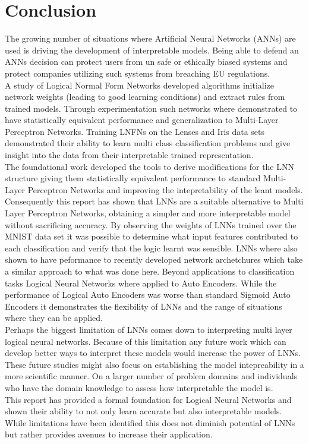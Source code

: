 \chapter{Conclusion}\label{C:con}
The growing number of situations where Artificial Neural Networks (ANNs) are used is driving the development of interpretable models. Being able to defend an ANNs decision can protect users from un safe or ethically biased systems and protect companies utilizing such systems from breaching EU regulations.\\

A study of Logical Normal Form Networks developed algorithms initialize network weights (leading to good learning conditions) and extract rules from trained models. Through experimentation such networks where demonstrated to have statistically equivalent performance and generalization to Multi-Layer Perceptron Networks. Training LNFNs on the Lenses and Iris data sets demonstrated their ability to learn multi class classification problems and give insight into the data from their interpretable trained representation.\\

The foundational work developed the tools to derive modifications for the LNN structure giving them statistically equivalent performance to standard Multi-Layer Perceptron Networks and improving the intepretability of the leant models. Consequently this report has shown that LNNs are a suitable alternative to Multi Layer Perceptron Networks, obtaining a simpler and more interpretable model without sacrificing accuracy. By observing the weights of LNNs trained over the MNIST data set it was possible to determine what input features contributed to each classification and verify that the logic learnt was sensible. LNNs where also shown to have peformance to recently developed network archetchures which take a similar approach to what was done here. Beyond applications to classification tasks Logical Neural Networks where applied to Auto Encoders. While the performance of Logical Auto Encoders was worse than standard Sigmoid Auto Encoders it demonstrates the flexibility of LNNs and the range of situations where they can be applied.\\

Perhaps the biggest limitation of LNNs comes down to interpreting multi layer logical neural networks. Because of this limitation any future work which can develop better ways to interpret these models would increase the power of LNNs. These future studies might also focus on establishing the model intepreability in a more scientific manner. On a larger number of problem domains and individuals who have the domain knowledge to assess how interpretable the model is.\\

This report has provided a formal foundation for Logical Neural Networks and shown their ability to not only learn accurate but also interpretable models. While limitations have been identified this does not diminish potential of LNNs but rather provides avenues to increase their application.




